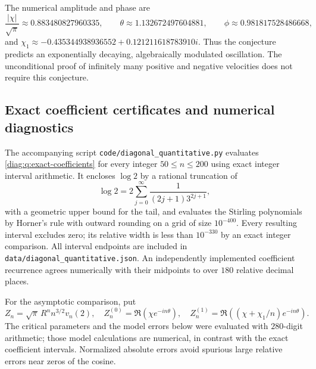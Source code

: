 \documentclass[11pt,a4paper]{article}
\theoremstyle{definition}
\theoremstyle{remark}
\numberwithin{equation}{section}
\begin{document}
The numerical amplitude and phase are
\[
 \frac{|\chi|}{\sqrt\pi}\approx0.883480827960335,
 \qquad \theta\approx1.132672497604881,
 \qquad \phi\approx0.981817528486668,
\]
and
$\chi_1\approx-0.435344938936552+0.121211618783910i$.
Thus the conjecture predicts an exponentially decaying, algebraically
modulated oscillation.  The unconditional proof of infinitely many
positive and negative velocities does not require this conjecture.

\subsection{Exact coefficient certificates and numerical diagnostics}
\label{diag:q:diagnostics-subsection}

The accompanying script \nolinkurl{code/diagonal_quantitative.py}
evaluates \eqref{diag:q:exact-coefficients} for every integer
$50\leq n\leq200$ using exact integer interval arithmetic.  It encloses
$\log2$ by a rational truncation of
\[
 \log2=2\sum_{j=0}^{\infty}\frac1{(2j+1)3^{2j+1}},
\]
with a geometric upper bound for the tail, and evaluates the Stirling
polynomials by Horner's rule with outward rounding on a grid of size
$10^{-400}$.  Every resulting interval excludes zero; its relative width
is less than $10^{-330}$ by an exact integer comparison.  All interval
endpoints are included in \nolinkurl{data/diagonal_quantitative.json}.
An independently implemented coefficient recurrence agrees numerically
with their midpoints to over $180$ relative decimal places.

For the asymptotic comparison, put
\[
 Z_n=\sqrt\pi\,R^n n^{3/2}v_n(2),\quad
 Z_n^{(0)}=\Re(\chi e^{-in\theta}),\quad
 Z_n^{(1)}=\Re((\chi+\chi_1/n)e^{-in\theta}).
\]
The critical parameters and the model errors below were evaluated with
$280$-digit arithmetic; those model calculations are numerical, in
contrast with the exact coefficient intervals.  Normalized absolute
errors avoid spurious large relative errors near zeros of the cosine.
\end{document}
